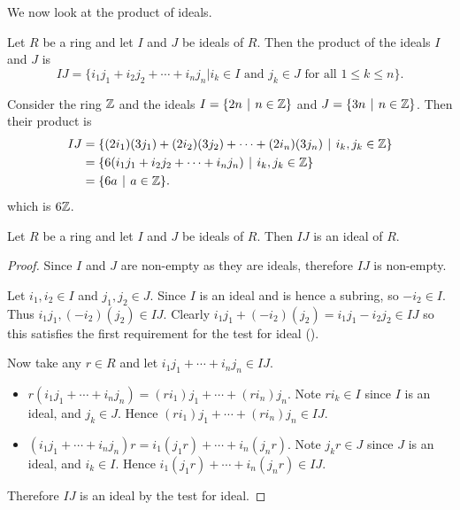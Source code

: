 We now look at the product of ideals.
\begin{definition}
    Let $R$ be a ring and let $I$ and $J$ be ideals of $R$. Then the product of the ideals $I$ and $J$ is
    \[
        IJ = \{i_1j_1 + i_2j_2 + \cdots + i_nj_n \vert i_k\in I \text{ and } j_k\in J \text{ for all } 1 \leq k \leq n\}.
    \]
\end{definition}

\begin{example}
    Consider the ring $\mathbb{Z}$ and the ideals $I = \{2n \vert n \in \Z\}$ and $J = \{3n \vert n \in \Z\}$. Then their product is
    \begin{align*}
        IJ &= \{(2i_1)(3j_1) + (2i_2)(3j_2) + \cdots + (2i_n)(3j_n) \vert i_k,j_k \in \Z\}\\
        &= \{6(i_1j_1 + i_2j_2 + \cdots + i_nj_n) \vert i_k,j_k \in \Z\}\\
        &= \{6a \vert a \in \Z\}.
    \end{align*}
    which is $6\mathbb{Z}$.
\end{example}

\begin{proposition}\label{prop-product-of-ideals-is-ideal}
    Let $R$ be a ring and let $I$ and $J$ be ideals of $R$. Then $IJ$ is an ideal of $R$.
\end{proposition}
\begin{proof}
    Since $I$ and $J$ are non-empty as they are ideals, therefore $IJ$ is non-empty.

    Let $i_1,i_2 \in I$ and $j_1,j_2 \in J$. Since $I$ is an ideal and is hence a subring, so $-i_2 \in I$. Thus $i_1j_1, (-i_2)(j_2) \in IJ$. Clearly $i_1j_1 + (-i_2)(j_2) = i_1j_1 - i_2j_2 \in IJ$ so this satisfies the first requirement for the test for ideal ().

    Now take any $r \in R$ and let $i_1j_1 + \cdots + i_nj_n \in IJ$.
    \begin{itemize}
        \item $r(i_1j_1 + \cdots + i_nj_n) = (ri_1)j_1 + \cdots + (ri_n)j_n$. Note $ri_k \in I$ since $I$ is an ideal, and $j_k \in J$. Hence $(ri_1)j_1 + \cdots + (ri_n)j_n \in IJ$.
        \item $(i_1j_1 + \cdots + i_nj_n)r = i_1(j_1r) + \cdots + i_n(j_nr)$. Note $j_kr \in J$ since $J$ is an ideal, and $i_k \in I$. Hence $i_1(j_1r) + \cdots + i_n(j_nr) \in IJ$.
    \end{itemize}

    Therefore $IJ$ is an ideal by the test for ideal.
\end{proof}

